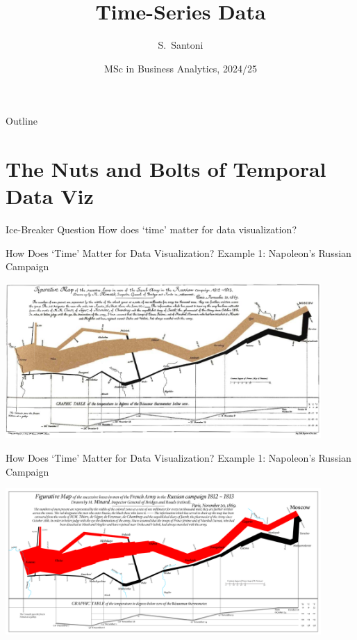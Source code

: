\documentclass[notes, aspectratio=1610]{beamer}
\title{Time-Series Data}
\author{S.~Santoni\inst{1}}
\institute{
	\inst{1}%
	Bayes Business School
	}
\date{MSc in Business Analytics, 2024/25}
\begin{document}
\begin{frame}
	\titlepage
\end{frame}

\begin{frame}{Outline}
	\tableofcontents
\end{frame}

\section{The Nuts and Bolts of Temporal Data Viz}

\begin{frame}{Ice-Breaker Question}{}
	\centering 
	\Large 
	How does `time' matter for data visualization?
\end{frame}

\begin{frame}{How Does `Time' Matter for Data Visualization?}
	{Example 1: Napoleon's Russian Campaign}
	\centering 
	\Large

	\includegraphics[width=0.9\textwidth]{images/russian_campaign.png}

\end{frame}

\begin{frame}{How Does `Time' Matter for Data Visualization?}
	{Example 1: Napoleon's Russian Campaign}
	\centering 
	\Large

	\includegraphics[width=0.9\textwidth]{images/1920px-Minard_Update.png}

\end{frame}
\end{document}
